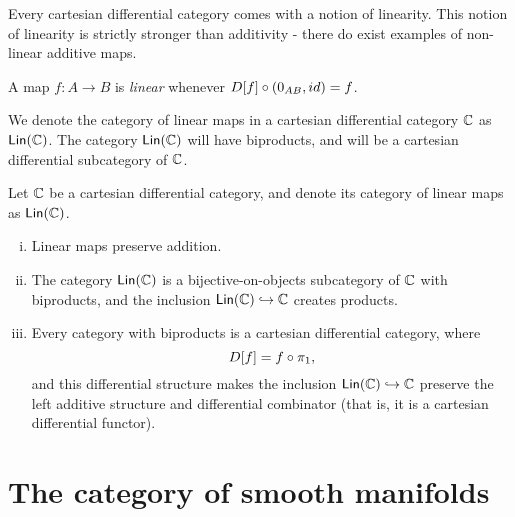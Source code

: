 Every cartesian differential category comes with a notion of linearity.
This notion of linearity is strictly stronger than additivity - there do exist examples of non-linear additive maps.
\begin{definition}\label{def:linear-map-in-cdc}
    A map $f:A \to B$ is \textit{linear} whenever $D[f] \circ (0_{AB},id) = f$. 
\end{definition}
We denote the category of linear maps in a cartesian differential category $\mathbb{C}$ as $\mathsf{Lin}(\mathbb{C})$.
The category $\mathsf{Lin}(\mathbb{C})$ will have biproducts, and will be a cartesian differential subcategory of $\mathbb{C}$.
\begin{lemma}\label{lem:collected-remarks-lin}
    Let $\mathbb{C}$ be a cartesian differential category, and denote its category of linear maps as $\mathsf{Lin}(\mathbb{C})$.
    \begin{enumerate}[(i)]
        \item Linear maps preserve addition.
        \item The category $\mathsf{Lin}(\mathbb{C})$ is a bijective-on-objects subcategory of $\mathbb{C}$ with biproducts, and the inclusion $\mathsf{Lin}(\mathbb{C}) \hookrightarrow \mathbb{C}$ creates products. 
        \item Every category with biproducts is a cartesian differential category, where
        \[
            D[f] = f \circ \pi_1,
        \]
        and this differential structure makes the inclusion $\mathsf{Lin}(\mathbb{C}) \hookrightarrow \mathbb{C}$ preserve the left additive structure and differential combinator (that is, it is a cartesian differential functor). 
    \end{enumerate}
\end{lemma}


\section{The category of smooth manifolds}%
\label{sec:smooth-manifolds}


